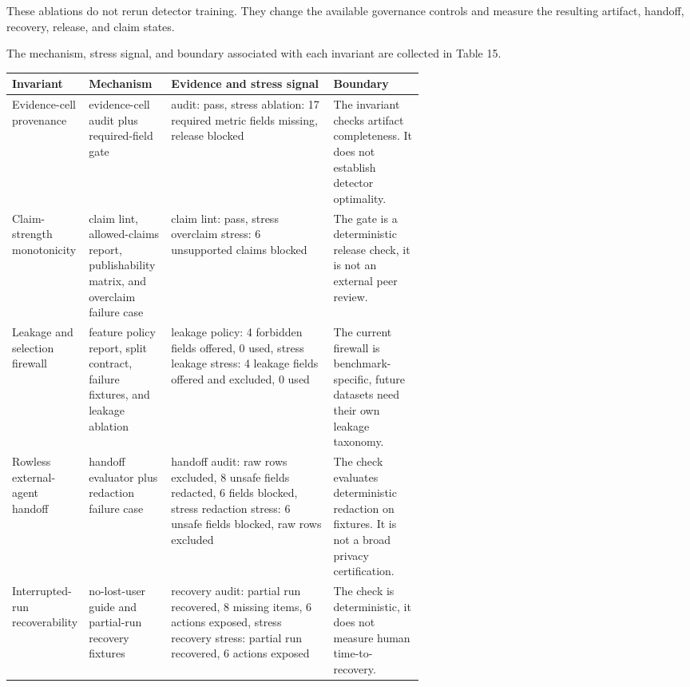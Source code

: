 \documentclass[11pt]{article}
\begin{document}
These ablations do not rerun detector training. They change the available governance controls and measure the resulting artifact, handoff, recovery, release, and claim states.

The mechanism, stress signal, and boundary associated with each invariant are collected in Table 15.

\begin{center}
\begin{minipage}{\linewidth}
\small
\setlength{\tabcolsep}{3pt}
\renewcommand{\arraystretch}{1.16}
\begin{tabularx}{\linewidth}{@{}>{\raggedright\arraybackslash}p{0.18\linewidth} >{\raggedright\arraybackslash}p{0.20\linewidth} >{\raggedright\arraybackslash}X >{\raggedright\arraybackslash}p{0.22\linewidth}@{}}
\toprule
Invariant & Mechanism & Evidence and stress signal & Boundary \\
\midrule
Evidence-cell provenance & evidence-cell audit plus required-field gate & audit: pass, stress ablation: 17 required metric fields missing, release blocked & The invariant checks artifact completeness. It does not establish detector optimality. \\
Claim-strength monotonicity & claim lint, allowed-claims report, publishability matrix, and overclaim failure case & claim lint: pass, stress overclaim stress: 6 unsupported claims blocked & The gate is a deterministic release check, it is not an external peer review. \\
Leakage and selection firewall & feature policy report, split contract, failure fixtures, and leakage ablation & leakage policy: 4 forbidden fields offered, 0 used, stress leakage stress: 4 leakage fields offered and excluded, 0 used & The current firewall is benchmark-specific, future datasets need their own leakage taxonomy. \\
Rowless external-agent handoff & handoff evaluator plus redaction failure case & handoff audit: raw rows excluded, 8 unsafe fields redacted, 6 fields blocked, stress redaction stress: 6 unsafe fields blocked, raw rows excluded & The check evaluates deterministic redaction on fixtures. It is not a broad privacy certification. \\
Interrupted-run recoverability & no-lost-user guide and partial-run recovery fixtures & recovery audit: partial run recovered, 8 missing items, 6 actions exposed, stress recovery stress: partial run recovered, 6 actions exposed & The check is deterministic, it does not measure human time-to-recovery. \\

\end{tabularx}
\end{minipage}
\end{center}
\end{document}
